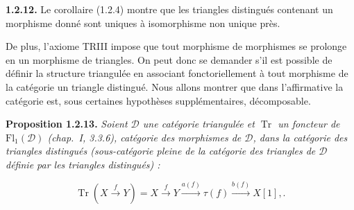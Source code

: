 \medskip
\noindent\textbf{1.2.12.}\quad
Le corollaire (1.2.4) montre que les triangles distingués contenant un
morphisme donné sont uniques à isomorphisme non unique près.

De plus, l'axiome TRIII impose que tout morphisme de morphismes se prolonge
en un morphisme de triangles. On peut donc se demander s'il est possible de
définir la structure triangulée en associant fonctoriellement à tout
morphisme de la catégorie un triangle distingué. Nous allons montrer que
dans l'affirmative la catégorie est, sous certaines hypothèses
supplémentaires, décomposable.

\medskip
\noindent\textbf{Proposition 1.2.13.}\quad
\textit{Soient $\mathcal D$ une catégorie triangulée et $\operatorname{Tr}$
un foncteur de $\mathrm{Fl}_1(\mathcal D)$ (chap.~I, 3.3.6), catégorie des
morphismes de $\mathcal D$, dans la catégorie des triangles distingués
(sous-catégorie pleine de la catégorie des triangles de $\mathcal D$
définie par les triangles distingués) :}

\[
  \operatorname{Tr}\!\left(X\xrightarrow{f}Y\right)
  =X\xrightarrow{f}Y\xrightarrow{a(f)}\tau(f)
  \xrightarrow{b(f)}X[1], .
\]
\endgroup
